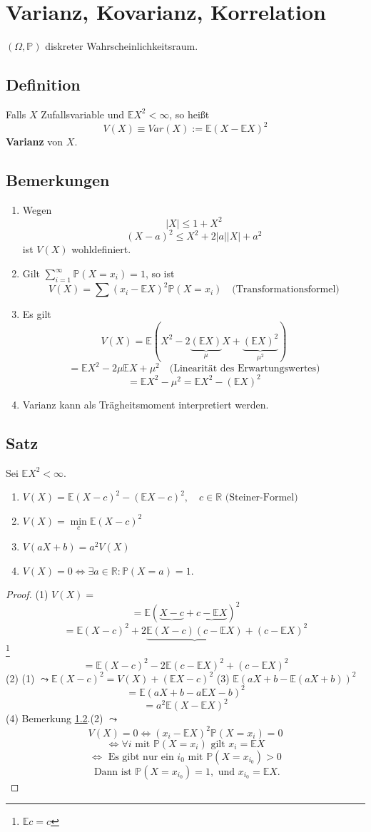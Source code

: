 \documentclass[a4paper,11pt,notitlepage]{report}
\newcommand{\R}{{\ensuremath{\mathbb{R}}}}
\newcommand{\Prim}{{\ensuremath{\mathbb{P}}}}
\newcommand{\E}{{\ensuremath{\mathbb{E}}}}
\begin{document}
\chapter{Varianz, Kovarianz, Korrelation}
$(\Omega, \Prim)$ diskreter Wahrscheinlichkeitsraum.

\section{Definition}
Falls $X$ Zufallsvariable und $\E X^2 < \infty$, so heißt
$$V(X)\equiv Var(X) := \E (X - \E X)^2$$
\textbf{Varianz} von $X$.

\section{Bemerkungen}
\label{bem112}
\begin{enumerate}
	\item Wegen $$|X| \leq 1 + X^2$$
		$$(X-a)^2 \leq X^2 + 2 |a| |X| + a^2$$
		ist $V(X)$ wohldefiniert.
	\item Gilt $\sum\limits_{i=1}^\infty{\Prim(X=x_i)} = 1$, so ist
		$$V(X) = \sum{(x_i - \E X)^2 \Prim(X=x_i)} \quad \text{(Transformationsformel)}$$
	\item Es gilt 
		$$V(X) = \E (X^2-2 \underbrace{(\E X)}_{\mu} X + \underbrace{(\E X)^2}_{\mu ^2})$$
		$$= \E X^2 - 2 \mu \E X + \mu ^2 \quad \text{(Linearität des Erwartungswertes)}$$
		$$= \E X^2 - \mu ^2 = \E X^2 - (\E X)^2$$
	\item Varianz kann als Trägheitsmoment interpretiert werden.
\end{enumerate}

\section{Satz}
Sei $\E X^2 < \infty$.
\begin{enumerate}
	\item $V(X) = \E(X-c)^2 - (\E X - c)^2, \quad c \in \R \text{ (Steiner-Formel)}$
	\item $V(X) = \min\limits_{c}{ \E(X-c)^2}$
	\item $V(aX + b) = a^2 V(X)$
	\item $V(X) = 0 \Leftrightarrow \exists a \in \R \colon \Prim(X=a) = 1.$
\end{enumerate}

\begin{proof}
	(1) $V(X)=$
		$$= \E ( \underbrace{X-c} + \underbrace{c-\E X})^2$$
		$$= \E(X-c)^2 + 2 \underbrace{\E (X-c)(c- \E X)} + (c - \E X)^2$$ \footnote{$\E c = c$}
		$$= \E(X-c)^2 - 2 \E (c - \E X)^2 + (c - \E X)^2$$
	(2) (1) $\leadsto \E (X-c)^2 = V(X) + (\E X -c)^2$
	\newline
	(3) $\E (aX+b - \E (aX + b))^2$
	$$= \E (aX + b - a \E X - b)^2$$
	$$= a^2 \E (X - \E X)^2$$
	(4) Bemerkung \ref{bem112}.(2) $\leadsto$ 
	$$V(X) = 0 \Leftrightarrow (x_i - \E X)^2 \Prim(X=x_i)=0$$
	$$\Leftrightarrow \forall i \text{ mit } \Prim(X= x_i) \text{ gilt } x_i = \E X$$
	$$\Leftrightarrow \text{ Es gibt nur ein $i_0$ mit } \Prim(X=x_{i_0})>0$$
	$$ \text{ Dann ist } \Prim(X=x_{i_0}) = 1, \text{ und } x_{i_0} = \E X.$$
\end{proof}
\end{document}
